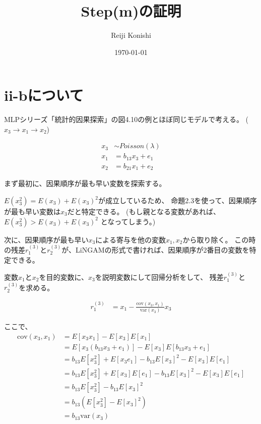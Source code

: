 \documentclass[uplatex]{jsarticle}
\title{Step(m)の証明}
\author{Reiji Konishi}
\date{\today}
\theoremstyle{definition}
\begin{document}
\maketitle

\section{ii-bについて}

MLPシリーズ「統計的因果探索」の図4.10の例とほぼ同じモデルで考える。
($x_3 \rightarrow x_1 \rightarrow x_2$)



\begin{align*}
  x_3 &\sim Poisson(\lambda) \\
  x_1 &= b_{13}x_3 + e_1 \\
  x_2 &= b_{21}x_1 + e_2
\end{align*}

まず最初に、因果順序が最も早い変数を探索する。

$E(x_3^2) = E(x_3) + E(x_3)^2$が成立しているため、
命題2.3を使って、因果順序が最も早い変数は$x_3$だと特定できる。
(もし親となる変数があれば、$E(x_3^2) > E(x_3) + E(x_3)^2$ となってしまう。)

次に、因果順序が最も早い$x_3$による寄与を他の変数$x_1, x_2$から取り除く。
この時の残差$r_1^{(3)}$と$r_2^{(3)}$が、LiNGAMの形式で書ければ、因果順序が2番目の変数を特定できる。

変数$x_1$と$x_2$を目的変数に、$x_3$を説明変数にして回帰分析をして、
残差$r_1^{(3)}$と$r_2^{(3)}$を求める。

\begin{align}
  r_1^{(3)} &= x_1 - \frac{\text{cov}(x_3, x_1)}{\text{var}(x_3)} x_3
\end{align}

ここで、
\begin{align}
  \text{cov}(x_3, x_1) &= E[x_3 x_1] - E[x_3]E[x_1] \\
                       &= E[x_3 (b_{13}x_3 + e_1)] - E[x_3]E[b_{13}x_3 + e_1] \\
                       &= b_{13}E[x_3^2] + E[x_3 e_1] - b_{13}E[x_3]^2 - E[x_3]E[e_1] \\
                       &= b_{13}E[x_3^2] + E[x_3]E[e_1] - b_{13}E[x_3]^2 - E[x_3]E[e_1] \\
                       &= b_{13}E[x_3^2] - b_{13}E[x_3]^2 \\
                       &= b_{13}(E[x_3^2] - E[x_3]^2) \\
                       &= b_{13}\text{var}(x_3)
\end{align}
\end{document}
